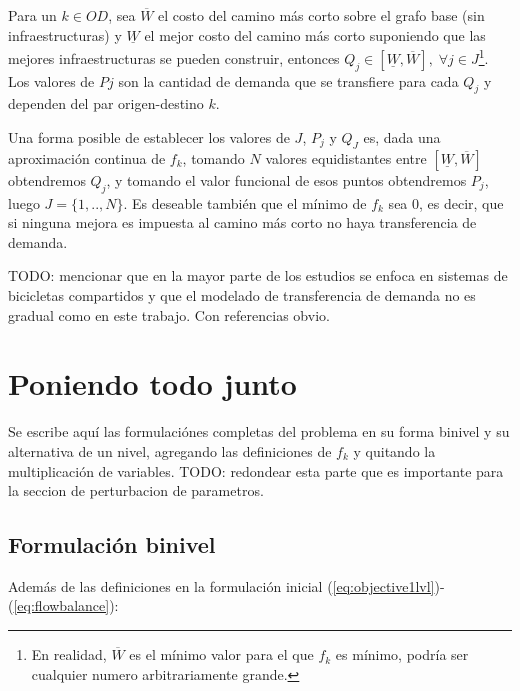 \documentclass{article}
\begin{document}
  Para un $k \in OD$, sea $\overline{W}$ el costo del camino más corto sobre el grafo base (sin infraestructuras) y $\underline{W}$ el mejor costo del camino más corto suponiendo que las mejores infraestructuras se pueden construir, entonces $Q_j \in [\underline{W}, \overline{W}],\; \forall j \in J$\footnote{En realidad, $\overline{W}$ es el mínimo valor para el que $f_k$ es mínimo, podría ser cualquier numero arbitrariamente grande.}. Los valores de $Pj$ son la cantidad de demanda que se transfiere para cada $Q_j$ y dependen del par origen-destino $k$.

  Una forma posible de establecer los valores de $J$, $P_j$ y $Q_J$ es, dada una aproximación continua de $f_k$, tomando $N$ valores equidistantes entre $[\underline{W}, \overline{W}]$ obtendremos $Q_j$, y tomando el valor funcional de esos puntos obtendremos $P_j$, luego $J=\{1,..,N\}$. Es deseable también que el mínimo de $f_k$ sea 0, es decir, que si ninguna mejora es impuesta al camino más corto no haya transferencia de demanda.

  TODO: mencionar que en la mayor parte de los estudios se enfoca en sistemas de bicicletas compartidos y que el modelado de transferencia de demanda no es gradual como en este trabajo. Con referencias obvio.

  \section*{Poniendo todo junto}

  Se escribe aquí las formulaciónes completas del problema en su forma binivel y su alternativa de un nivel, agregando las definiciones de $f_k$ y quitando la multiplicación de variables. TODO: redondear esta parte que es importante para la seccion de perturbacion de parametros.

  \subsection*{Formulación binivel}

  Además de las definiciones en la formulación inicial (\ref{eq:objective1lvl})-(\ref{eq:flowbalance}):
\end{document}
